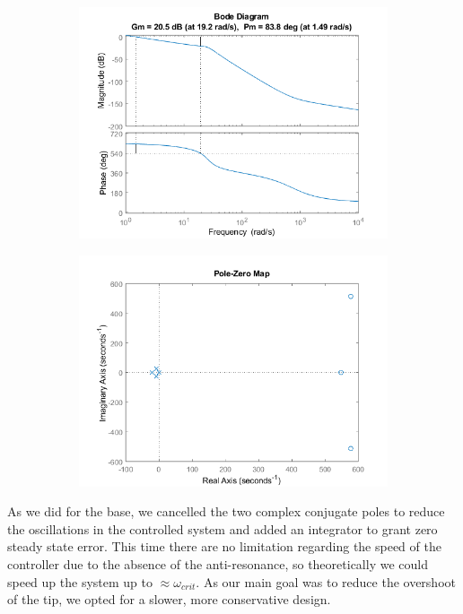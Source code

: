 \begin{figure}[H]
     \centering
     \begin{subfigure}{0.47\textwidth}
         \centering
         \includegraphics[width=\textwidth]{./images/Chapter 4/FB/Bode_uncontrolled.png}
     \end{subfigure}
     \hfill
     \begin{subfigure}{0.47\textwidth}
         \centering
         \includegraphics[width=\textwidth]{./images/Chapter 4/FB/pzmap.png}
     \end{subfigure}
\end{figure}


As we did for the base, we cancelled the two complex conjugate poles to reduce the oscillations in the controlled system and added an integrator to grant zero steady state error. This time there are no limitation regarding the speed of the controller due to the absence of the anti-resonance, so theoretically we could speed up the system up to $\approx \omega_{crit}$. As our main goal was to reduce the overshoot of the tip, we opted for a slower, more conservative design.

